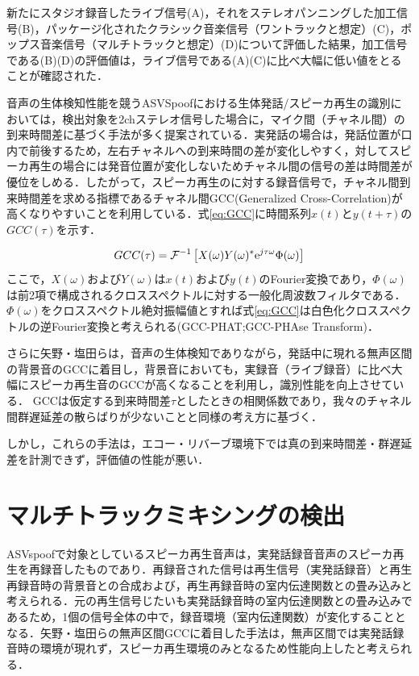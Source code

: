 \documentclass[technicalreport]{ieicej}
\begin{document}
新たにスタジオ録音したライブ信号(A)，それをステレオパンニングした加工信号(B)，パッケージ化されたクラシック音楽信号（ワントラックと想定）(C)，ポップス音楽信号（マルチトラックと想定）(D)について評価した結果，加工信号である(B)(D)の評価値は，ライブ信号である(A)(C)に比べ大幅に低い値をとることが確認された．

音声の生体検知性能を競うASVSpoofにおける生体発話/スピーカ再生の識別においては，検出対象を2chステレオ信号した場合に，マイク間（チャネル間）の到来時間差に基づく手法が多く提案されている．実発話の場合は，発話位置が口内で前後するため，左右チャネルへの到来時間の差が変化しやすく，対してスピーカ再生の場合には発音位置が変化しないためチャネル間の信号の差は時間差が優位をしめる．したがって，スピーカ再生のに対する録音信号で，チャネル間到来時間差を求める指標であるチャネル間GCC(Generalized Cross-Correlation)\cite{GCC}が高くなりやすいことを利用している．式\eqref{eq:GCC}に時間系列$x(t)$と$y(t+\tau)$の$GCC(\tau)$を示す．

\begin{equation}
GCC(\tau) = \mathcal{F}^{-1}\left[X(\omega)Y(\omega)^{*}{\rm e}^{j\tau\omega}\Phi(\omega)\right] \label{eq:GCC}
\end{equation}
ここで，$X(\omega)$および$Y(\omega)$は$x(t)$および$y(t)$のFourier変換であり，$\Phi(\omega)$は前2項で構成されるクロススペクトルに対する一般化周波数フィルタである．$\Phi(\omega)$をクロススペクトル絶対振幅値とすれば式\eqref{eq:GCC}は白色化クロススペクトルの逆Fourier変換と考えられる(GCC-PHAT;GCC-PHAse Transform)．

さらに矢野・塩田らは，音声の生体検知でありながら，発話中に現れる無声区間の背景音のGCCに着目し，背景音においても，実録音（ライブ録音）に比べ大幅にスピーカ再生音のGCCが高くなることを利用し，識別性能を向上させている\cite{groundICGCC}．
GCCは仮定する到来時間差$\tau$としたときの相関係数であり，我々のチャネル間群遅延差の散らばりが少ないことと同様の考え方に基づく．

しかし，これらの手法は，エコー・リバーブ環境下では真の到来時間差・群遅延差を計測できず，評価値の性能が悪い．

\section{マルチトラックミキシングの検出}

ASVspoofで対象としているスピーカ再生音声は，実発話録音音声のスピーカ再生を再録音したものであり．再録音された信号は再生信号（実発話録音）と再生再録音時の背景音との合成および，再生再録音時の室内伝達関数との畳み込みと考えられる．元の再生信号じたいも実発話録音時の室内伝達関数との畳み込みであるため，1個の信号全体の中で，録音環境（室内伝達関数）が変化することとなる．矢野・塩田らの無声区間GCCに着目した手法は，無声区間では実発話録音時の環境が現れず，スピーカ再生環境のみとなるため性能向上したと考えられる．
\end{document}
